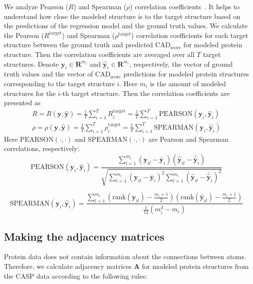 \documentclass[12pt,twosides]{extarticle}
\begin{document}
We analyze Pearson ($R$) and Spearman ($\rho$) correlation coefficients~\cite{3DCNN, Baldassarre2019GraphQAPM, 10.1093/bioinformatics/btz122}. It helps to understand how close the modeled structure is to the target structure based on the predictions of the regression model and the ground truth values. We calculate the Pearson ($R^\text{target}$) and Spearman ($\rho^\text{target}$) correlation coefficients for each target structure between the ground truth and predicted $\text{CAD}_\text{score}$ for modeled protein structure. Then the correlation coefficients are averaged over all $T$ target structures.
Denote $\mathbf{y}_i \in \mathbf{R}^{m_i}$ and $\mathbf{\hat{y}}_i \in \mathbf{R}^{m_i}$, respectively, the vector of ground truth values and the vector of $\text{CAD}_\text{score}$ predictions for modeled protein structures corresponding to the target structure $i$. Here $m_i$ is the amount of modeled structures for the $i$-th target structure. Then the correlation coefficients are presented as
\begin{align}
R = R\left(\mathbf{y}, \hat{\mathbf{y}}\right) = \frac{1}{T} \sum_{i=1}^{T} R^\text{target}_i=\frac{1}{T} \sum_{i=1}^{T} \text{PEARSON} \left(\mathbf{y}_i,\hat{\mathbf{y}}_i\right) \label{pearson}
\\ 
\rho= \rho\left(\mathbf{y}, \hat{\mathbf{y}}\right) = \frac{1}{T} \sum_{i=1}^{T} \rho^\text{target}_i = \frac{1}{T} \sum_{i=1}^{T} \text{SPEARMAN} \left(\mathbf{y}_i,\hat{\mathbf{y}}_i\right)
 \label{spearman}
\end{align}
Here $\text{PEARSON} (\cdot, \cdot)$ and $\text{SPEARMAN} (\cdot, \cdot)$ are Pearson and Spearman correlations, respectively:
\[\text{PEARSON}\left(\mathbf{y}_i,\hat{\mathbf{y}}_i\right) = \frac{\sum_{l=1}^{m_i}\left(\mathbf{y}_{i l}-\bar{\mathbf{y}}_{i}\right)\left( \hat{\mathbf{y}}_{i l}-\bar{ \hat{\mathbf{y}}}_{i}\right)}{\sqrt{\sum_{l=1}^{m_i}\left( \mathbf{y}_{i l}-\bar{ \mathbf{y}}_{i}\right)^{2} \sum_{l=1}^{m_i}\left( \hat{\mathbf{y}}_{i l}-\bar{ \hat{\mathbf{y}}}_{i}\right)^{2}}}\]

\[ \text{SPEARMAN} \left(\mathbf{y}_i,\hat{\mathbf{y}}_i\right)=\frac{\sum_{l=1}^{m_i}\left(\text{rank}\left(
	\mathbf{y}_{i l}\right)-\frac{m_i+1}{2}\right)\left(\text{rank}
	\left( \hat{\mathbf{y}}_{i l}\right)-\frac{m_i+1}{2}\right)}{\frac{1}{12}\left(m_i^{3}-m_i\right)}
\]

\subsection{Making the adjacency matrices}
Protein data does not contain information about the connections between atoms. Therefore, we calculate adjacency matrices $\textbf{A}$ for modeled protein structures from the CASP data according to the following rules:
\end{document}
